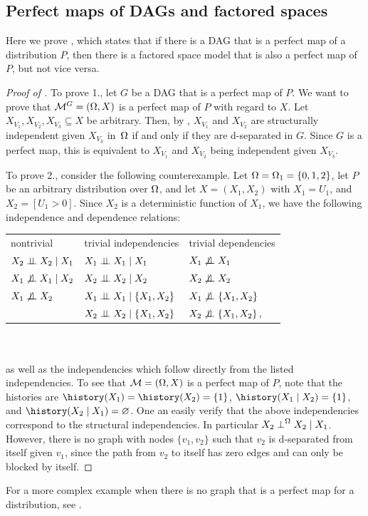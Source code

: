 \documentclass[USenglish,onecolumn]{article}
\begin{document}
\subsection{Perfect maps of DAGs and factored spaces}\label{sec:proofperfectmap}
Here we prove , which states that if there is a DAG that is a perfect map of a distribution $P$, then there is a factored space model that is also a perfect map of $P$, but not vice versa.

\begin{proof}[Proof of ]
    To prove 1., let $G$ be a DAG that is a perfect map of $P$. We want to prove that $\mathcal{M}^G=(\Omega, X)$ is a perfect map of $P$ with regard to $X$. Let $X_{V_1},X_{V_2}, X_{V_3} \subseteq X$ be arbitrary. Then, by , $X_{V_1}$ and $X_{V_2}$ are structurally independent given $X_{V_3}$ in~$\Omega$ if and only if they are d-separated in $G$. Since $G$ is a perfect map, this is equivalent to $X_{V_1}$ and $X_{V_2}$ being independent given $X_{V_3}$.

    To prove 2., consider the following counterexample. Let $\Omega=\Omega_1=\{0, 1, 2\}$, let $P$ be an arbitrary distribution over $\Omega$, and let $X=(X_1,X_2)$ with $X_1=U_1$, and $X_2= [U_1>0]$. Since $X_2$ is a deterministic function of $X_1$, we have the following independence and dependence relations:\\

\begin{tabular}{@{}lll@{}}
nontrivial & trivial independencies & trivial dependencies\\
         $X_2\mathrel{\perp\!\!\!\perp} X_2\mid X_1$&$X_1\mathrel{\perp\!\!\!\perp} X_1\mid X_1$ & $X_1\not\mathrel{\perp\!\!\!\perp} X_1$ \\
         $X_1\not\mathrel{\perp\!\!\!\perp} X_1\mid X_2$&$X_2\mathrel{\perp\!\!\!\perp} X_2\mid X_2$ &$X_2\not\mathrel{\perp\!\!\!\perp} X_2$ \\
         $X_1\not\mathrel{\perp\!\!\!\perp} X_2$&$X_1\mathrel{\perp\!\!\!\perp} X_1\mid \{X_1, X_2\}$ &$X_1\not\mathrel{\perp\!\!\!\perp} \{X_1,X_2\}$\\
         &$X_2\mathrel{\perp\!\!\!\perp} X_2\mid \{X_1, X_2\}$  & $X_2\not\mathrel{\perp\!\!\!\perp} \{X_1,X_2\}\,,$\\
    \end{tabular}\\\\
    as well as the independencies which follow directly from the listed independencies.
    To see that $\mathcal{M}=(\Omega,X)$ is a perfect map of $P$, note that the histories are $\history(X_1)=\history(X_2)=\{1\}$, $\history(X_1\given X_2)=\{1\}$, and $\history(X_2\given X_1)=\nothing$. One an easily verify that the above independencies correspond to the structural independencies. In particular $X_2\mathrel{\perp}^\Omega X_2\mid X_1$. However, there is no graph with nodes $\{v_1,v_2\}$ such that $v_2$ is d-separated from itself given $v_1$, since the path from $v_2$ to itself has zero edges and can only be blocked by itself.
\end{proof}
For a more complex example when there is no graph that is a perfect map for a distribution, see .
\end{document}
